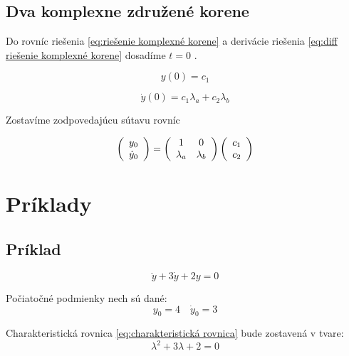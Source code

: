 \documentclass[a4paper,10pt]{article}
\begin{document}
\subsection{Dva komplexne združené korene}

Do rovníc riešenia \eqref{eq:riešenie komplexné korene} a derivácie riešenia \eqref{eq:diff riešenie komplexné korene} dosadíme $t=0$ .

\begin{equation}
	y(0)=c_1
\end{equation}
	
\begin{equation}
	\dot{y}(0)=c_1\lambda_a+c_2\lambda_b
\end{equation}

Zostavíme zodpovedajúcu sútavu rovníc

\begin{equation}
\label{eq:sústava pre komplexné korene}
	\left(\begin{array}{c}
		y_0\\
		\dot{y}_0\\
	\end{array}\right)=
	\left(\begin{array}{c c}
	 	1 & 0 \\
	 	\lambda_a & \lambda_b \\
	\end{array}\right)
	\left(\begin{array}{c}
		c_1\\
		c_2\\
	\end{array}\right)
\end{equation}

\pagebreak

\section{Príklady}

\subsection{Príklad}
\begin{equation*}
\ddot{y}+3\dot{y}+2y=0 
\end{equation*}

Počiatočné podmienky nech sú dané:
\begin{equation*}
	y_0=4\quad \dot{y}_0=3
\end{equation*}

Charakteristická rovnica \eqref{eq:charakteristická rovnica} bude zostavená v tvare:
\begin{equation*}
\lambda^2+3\lambda+2=0
\end{equation*}
\end{document}
